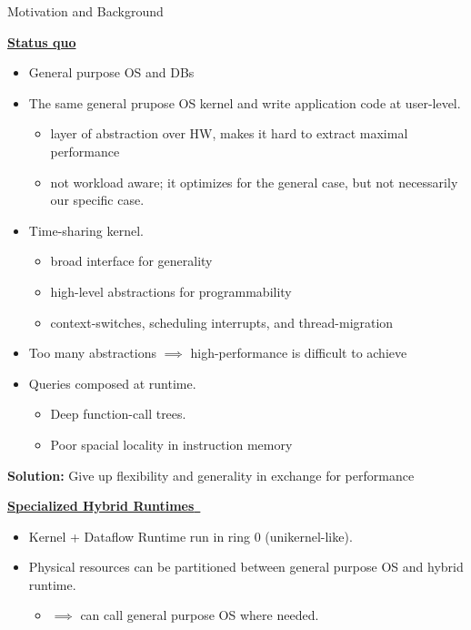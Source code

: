 \begin{block}{Motivation and Background}

\underline{\textbf{Status quo}}
  \begin{itemize}
  \item General purpose OS and DBs%
  \item The same general prupose OS kernel and write application code at user-level.
    \begin{itemize}
    \item layer of abstraction over HW, makes it hard to extract maximal performance
    \item not workload aware; it optimizes for the general case, but not necessarily our specific case.
    \end{itemize}
 
  \item Time-sharing kernel.
    \begin{itemize}
    \item broad interface for generality
    \item high-level abstractions for programmability
    \item context-switches, scheduling interrupts, and thread-migration
    \end{itemize}
    \item Too many abstractions $\implies$ high-performance is difficult to achieve~\cite{GICEVA:2016:OS_SUPPORT}
  
  \item Queries composed at runtime.
    \begin{itemize}
    \item Deep function-call trees.
    \item Poor spacial locality in instruction memory
    \end{itemize}
  \end{itemize}

  \begin{center}
    \alert{\textbf{Solution:} Give up flexibility and generality in exchange for performance}
  \end{center}
   
  \underline{\textbf{Specialized Hybrid Runtimes}~\cite{HALE:2015:NAUTILUS}}
    \begin{itemize}
    \item Kernel + Dataflow Runtime run in ring 0 (unikernel-like).
    \item Physical resources can be partitioned between general purpose OS and hybrid runtime\cite{KOCOLOSKI:2015:PISCES}.
      \begin{itemize}
      \item $\implies$ can call general purpose OS where needed.
      \end{itemize}


\end{itemize}
\end{block}
